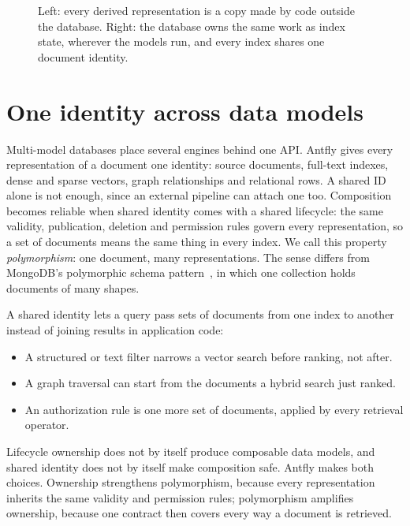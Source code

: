 \documentclass[sigconf,nonacm]{acmart}
\begin{document}
\begin{figure}[t]
  \centering
  
  \caption{Left: every derived representation is a copy made by code outside
    the database. Right: the database owns the same work as index state,
    wherever the models run, and every index shares one document identity.}
  \label{fig:overview}
\end{figure}

\section{One identity across data models}
\label{sec:identity}

Multi-model databases place several engines behind one API. Antfly gives
every representation of a document one identity: source documents,
full-text indexes, dense and sparse vectors, graph relationships and
relational rows. A shared ID alone is not enough, since an external pipeline
can attach one too. Composition becomes reliable when shared identity comes
with a shared lifecycle: the same validity, publication, deletion and
permission rules govern every representation, so a set of documents means
the same thing in every index. We call this property \emph{polymorphism}:
one document, many representations. The sense differs from MongoDB's
polymorphic schema pattern~\cite{mongodb-polymorphic}, in which one
collection holds documents of many shapes.

A shared identity lets a query pass sets of documents from one index to
another instead of joining results in application code:
\begin{itemize}
  \item A structured or text filter narrows a vector search before ranking,
    not after.
  \item A graph traversal can start from the documents a hybrid search just
    ranked.
  \item An authorization rule is one more set of documents, applied by every
    retrieval operator.
\end{itemize}

Lifecycle ownership does not by itself produce composable data models, and
shared identity does not by itself make composition safe. Antfly makes both
choices. Ownership strengthens polymorphism, because every representation
inherits the same validity and permission rules; polymorphism amplifies
ownership, because one contract then covers every way a document is
retrieved.
\end{document}

